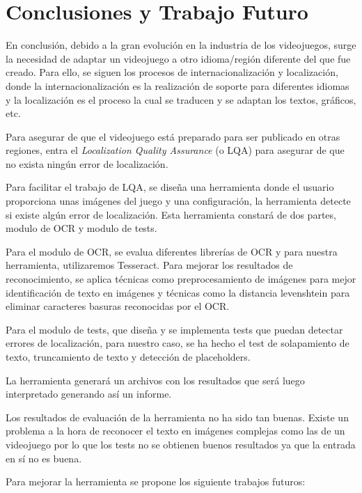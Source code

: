 \chapter{Conclusiones y Trabajo Futuro}
\label{cap:conclusiones}

En conclusión, debido a la gran evolución en la industria de los videojuegos, surge la necesidad de adaptar un videojuego a otro idioma/región diferente del que fue creado. Para ello, se siguen los procesos de internacionalización y localización, donde la internacionalización es la realización de soporte para diferentes idiomas y la localización es el proceso la cual se traducen y se adaptan los textos, gráficos, etc.

Para asegurar de que el videojuego está preparado para ser publicado en otras regiones, entra el \textit{Localization Quality Assurance} (o LQA) para asegurar de que no exista ningún error de localización.

Para facilitar el trabajo de LQA, se diseña una herramienta donde el usuario proporciona unas imágenes del juego y una configuración, la herramienta detecte si existe algún error de localización. Esta herramienta constará de dos partes, modulo de OCR y modulo de tests.

Para el modulo de OCR, se evalua diferentes librerías de OCR y para nuestra herramienta, utilizaremos Tesseract. Para mejorar los resultados de reconocimiento, se aplica técnicas como preprocesamiento de imágenes para mejor identificación de texto en imágenes y técnicas como la distancia levenshtein para eliminar caracteres basuras reconocidas por el OCR.

Para el modulo de tests, que diseña y se implementa tests que puedan detectar errores de localización, para nuestro caso, se ha hecho el test de solapamiento de texto, truncamiento de texto y detección de placeholders.

La herramienta generará un archivos con los resultados que será luego interpretado generando así un informe.

Los resultados de evaluación de la herramienta no ha sido tan buenas. Existe un problema a la hora de reconocer el texto en imágenes complejas como las de un videojuego por lo que los tests no se obtienen buenos resultados ya que la entrada en sí no es buena.

Para mejorar la herramienta se propone los siguiente trabajos futuros:

